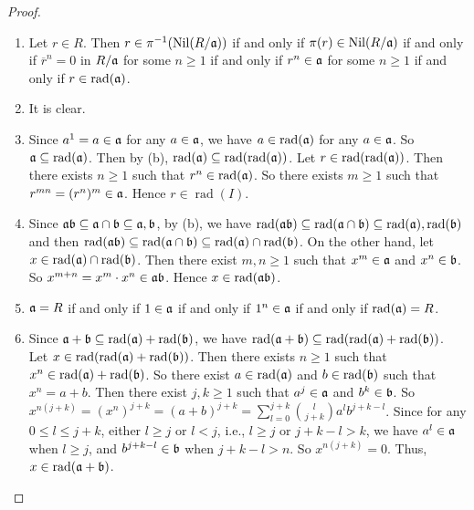 \begin{proof}
    \begin{enumerate}
        \item Let $r \in R$. Then $r \in \pi^{-1}(\operatorname{Nil}(R/\mathfrak{a}))$ if and only if $\pi(r) \in \operatorname{Nil}(R/\mathfrak{a})$ if and only if $\overbar r^n = 0$ in $R/\mathfrak{a}$ for some $n \geq 1$ if and only if $r^n \in \mathfrak{a}$ for some $n \geq 1$ if and only if $r \in \operatorname{rad}(\mathfrak{a})$.
        \item It is clear.
        \item Since $a^1 = a \in \mathfrak{a}$ for any $a \in \mathfrak{a}$, we have $a \in \operatorname{rad}(\mathfrak{a})$ for any $a \in \mathfrak{a}$. So $\mathfrak{a} \subseteq \operatorname{rad}(\mathfrak{a})$. Then by (b), $\operatorname{rad}(\mathfrak{a}) \subseteq \operatorname{rad}(\operatorname{rad}(\mathfrak{a}))$. Let $r \in \operatorname{rad}(\operatorname{rad}(\mathfrak{a}))$. Then there exists $n \geq 1$ such that $r^n \in \operatorname{rad}(\mathfrak{a})$. So there exists $m \geq 1$ such that $r^{mn} = (r^n)^m \in \mathfrak{a}$. Hence $r \in \operatorname{rad}(I)$. 
        \item Since $\mathfrak{a}\mathfrak{b} \subseteq \mathfrak{a} \cap \mathfrak{b} \subseteq \mathfrak{a},\mathfrak{b}$, by (b), we have $\operatorname{rad}(\mathfrak{a}\mathfrak{b}) \subseteq \operatorname{rad}(\mathfrak{a} \cap \mathfrak{b}) \subseteq \operatorname{rad}(\mathfrak{a}),\operatorname{rad}(\mathfrak{b})$ and then $\operatorname{rad}(\mathfrak{a}\mathfrak{b}) \subseteq \operatorname{rad}(\mathfrak{a} \cap \mathfrak{b}) \subseteq \operatorname{rad}(\mathfrak{a}) \cap \operatorname{rad}(\mathfrak{b})$. On the other hand, let $x \in \operatorname{rad}(\mathfrak{a}) \cap \operatorname{rad}(\mathfrak{b})$. Then there exist $m,n \geq 1$ such that $x^m \in \mathfrak{a}$ and $x^n \in \mathfrak{b}$. So $x^{m+n} = x^m \cdot x^n \in \mathfrak{a} \mathfrak{b}$. Hence $x \in \operatorname{rad}(\mathfrak{a}\mathfrak{b})$.
        \item $\mathfrak{a} = R$ if and only if $1 \in \mathfrak{a}$ if and only if $1^n \in \mathfrak{a}$ if and only if $\operatorname{rad}(\mathfrak{a}) = R$. 
        \item Since $\mathfrak{a} + \mathfrak{b} \subseteq \operatorname{rad}(\mathfrak{a}) + \operatorname{rad}(\mathfrak{b})$, we have $\operatorname{rad}(\mathfrak{a} + \mathfrak{b}) \subseteq \operatorname{rad}(\operatorname{rad}(\mathfrak{a}) + \operatorname{rad}(\mathfrak{b}))$. \\
            Let $x \in \operatorname{rad}(\operatorname{rad}(\mathfrak{a}) + \operatorname{rad}(\mathfrak{b}))$. Then there exists $n \geq 1$ such that $x^n \in \operatorname{rad}(\mathfrak{a}) + \operatorname{rad}(\mathfrak{b})$. So there exist $a \in \operatorname{rad}(\mathfrak{a})$ and $b \in \operatorname{rad}(\mathfrak{b})$ such that $x^n = a + b$. Then there exist $j,k \geq 1$ such that $a^j \in \mathfrak{a}$ and $b^k \in \mathfrak{b}$. So $x^{n(j+k)} = (x^n)^{j+k} = (a+b)^{j+k} = \sum_{l = 0}^{j+k} \binom{l}{j+k} a^lb^{j+k-l}$. Since for any $0 \leq l \leq j+k$, either $l \geq j$ or $l < j$, i.e., $l \geq j$ or $j+k-l > k$, we have $a^l \in \mathfrak{a}$ when $l \geq j$, and $b^{j+k-l} \in \mathfrak{b}$ when $j + k - l > n$. So $x^{n(j+k)} = 0$. Thus, $x\in \operatorname{rad}(\mathfrak{a}+\mathfrak{b})$.

\end{enumerate}
\end{proof}
